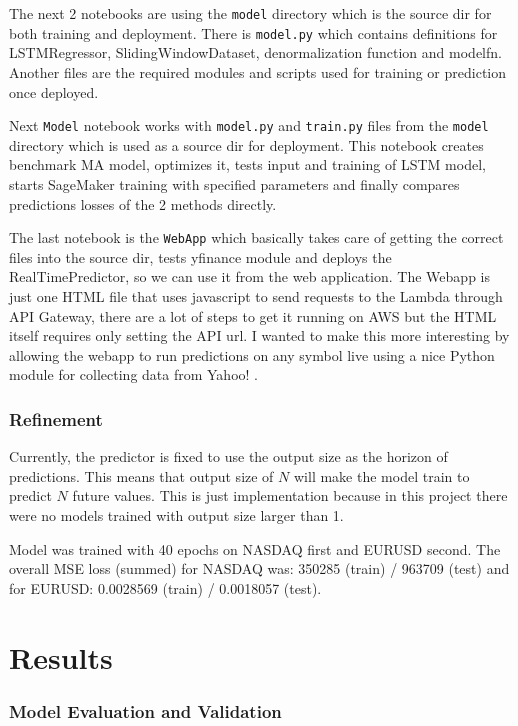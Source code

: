 \documentclass[a4paper,12pt]{article}
\begin{document}
The next 2 notebooks are using the \texttt{model} directory which is the source dir for both training and deployment. There is \texttt{model.py} which contains definitions for LSTMRegressor, SlidingWindowDataset, denormalization function and model\textunderscore fn. Another files are the required modules and scripts used for training or prediction once deployed.

Next \texttt{Model} notebook works with \texttt{model.py} and \texttt{train.py} files from the \texttt{model} directory which is used as a source dir for deployment. This notebook creates benchmark MA model, optimizes it, tests input and training of LSTM model, starts SageMaker training with specified parameters and finally compares predictions losses of the 2 methods directly.

The last notebook is the \texttt{WebApp} which basically takes care of getting the correct files into the source dir, tests yfinance module and deploys the RealTimePredictor, so we can use it from the web application.
The Webapp is just one HTML file that uses javascript to send requests to the Lambda through API Gateway, there are a lot of steps to get it running on AWS but the HTML itself requires only setting the API url. I wanted to make this more interesting by allowing the webapp to run predictions on any symbol live using a nice Python module for collecting data from Yahoo! \cite{yf}.

\section{Refinement}
Currently, the predictor is fixed to use the output size as the horizon of predictions. This means that output size of $N$ will make the model train to predict $N$ future values. This is just implementation because in this project there were no models trained with output size larger than 1.

Model was trained with 40 epochs on NASDAQ first and EURUSD second. The overall MSE loss (summed) for NASDAQ was: 350285 (train) / 963709 (test) and for EURUSD: 0.0028569 (train) / 0.0018057 (test).


\part{Results}
\section{Model Evaluation and Validation}
\end{document}
